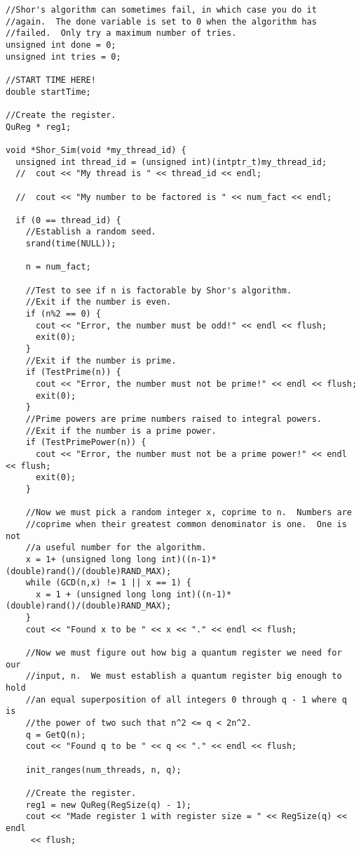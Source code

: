 \documentclass[]{article}
\begin{document}
\begin{verbatim}
//Shor's algorithm can sometimes fail, in which case you do it
//again.  The done variable is set to 0 when the algorithm has
//failed.  Only try a maximum number of tries.
unsigned int done = 0;
unsigned int tries = 0;

//START TIME HERE!
double startTime;

//Create the register.
QuReg * reg1;

void *Shor_Sim(void *my_thread_id) {
  unsigned int thread_id = (unsigned int)(intptr_t)my_thread_id;
  //  cout << "My thread is " << thread_id << endl;
  
  //  cout << "My number to be factored is " << num_fact << endl;

  if (0 == thread_id) {
    //Establish a random seed.
    srand(time(NULL));
    
    n = num_fact;
    
    //Test to see if n is factorable by Shor's algorithm.
    //Exit if the number is even.
    if (n%2 == 0) {
      cout << "Error, the number must be odd!" << endl << flush;
      exit(0);
    } 
    //Exit if the number is prime.
    if (TestPrime(n)) {
      cout << "Error, the number must not be prime!" << endl << flush;
      exit(0);
    }
    //Prime powers are prime numbers raised to integral powers.
    //Exit if the number is a prime power.
    if (TestPrimePower(n)) {
      cout << "Error, the number must not be a prime power!" << endl << flush;
      exit(0);
    }
    
    //Now we must pick a random integer x, coprime to n.  Numbers are
    //coprime when their greatest common denominator is one.  One is not
    //a useful number for the algorithm.
    x = 1+ (unsigned long long int)((n-1)*(double)rand()/(double)RAND_MAX);
    while (GCD(n,x) != 1 || x == 1) {
      x = 1 + (unsigned long long int)((n-1)*(double)rand()/(double)RAND_MAX);
    }
    cout << "Found x to be " << x << "." << endl << flush;
    
    //Now we must figure out how big a quantum register we need for our
    //input, n.  We must establish a quantum register big enough to hold
    //an equal superposition of all integers 0 through q - 1 where q is
    //the power of two such that n^2 <= q < 2n^2.
    q = GetQ(n);
    cout << "Found q to be " << q << "." << endl << flush;
    
    init_ranges(num_threads, n, q);
    
    //Create the register.
    reg1 = new QuReg(RegSize(q) - 1);
    cout << "Made register 1 with register size = " << RegSize(q) << endl 
	 << flush;  
    

\end{verbatim}
\end{document}
